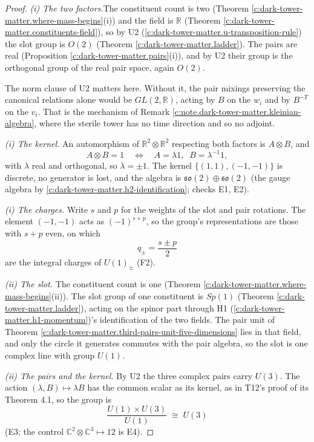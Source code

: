 \documentclass[11pt]{article}
\theoremstyle{definition}
\theoremstyle{plain}
\providecommand{\C}{}\renewcommand{\C}{\mathbb{C}}
\providecommand{\R}{}\renewcommand{\R}{\mathbb{R}}
\providecommand{\so}{}\renewcommand{\so}{\mathfrak{so}}
\begin{document}
\begin{proof}
\textit{(i) The two factors.}\enspace The constituent count is two (Theorem \ref{c:dark-tower-matter.where-mass-begins}(i)) and the field is $\R$ (Theorem \ref{c:dark-tower-matter.constituents-field}), so by U2 (\ref{c:dark-tower-matter.u-transposition-rule}) the slot group is $O(2)$ (Theorem \ref{c:dark-tower-matter.ladder}). The pairs are real (Proposition \ref{c:dark-tower-matter.pairs}(i)), and by U2 their group is the orthogonal group of the real pair space, again $O(2)$.

The norm clause of U2 matters here. Without it, the pair mixings preserving the canonical relations alone would be $GL(2,\R)$, acting by $B$ on the $w_{i}$ and by $B^{-T}$ on the $v_{i}$. That is the mechanism of Remark \ref{c:note.dark-tower-matter.kleinian-algebra}, where the sterile tower has no time direction and so no adjoint.



\emph{(i) The kernel.}  An automorphism of $\R^{2} \otimes \R^{2}$ respecting both factors is $A \otimes B$, and
\[
A \otimes B = 1 \quad\Longleftrightarrow\quad A = \lambda 1, \;\; B = \lambda^{-1}1,
\]
with $\lambda$ real and orthogonal, so $\lambda = \pm 1$. The kernel $\{(1,1), (-1,-1)\}$ is discrete, no generator is lost, and the algebra is $\so(2) \oplus \so(2)$ (the gauge algebra by \ref{c:dark-tower-matter.h2-identification}; checks E1, E2).



\emph{(i) The charges.}  Write $s$ and $p$ for the weights of the slot and pair rotations. The element $(-1, -1)$ acts as $(-1)^{s + p}$, so the group's representations are those with $s + p$ even, on which
\[
q_{\pm} = \frac{s \pm p}{2}
\]
are the integral charges of $U(1)_{\pm}$ (F2).



\emph{(ii) The slot.}  The constituent count is one (Theorem \ref{c:dark-tower-matter.where-mass-begins}(ii)). The slot group of one constituent is $Sp(1)$ (Theorem \ref{c:dark-tower-matter.ladder}), acting on the spinor part through H1 (\ref{c:dark-tower-matter.h1-momentum})'s identification of the two fields. The pair unit of Theorem \ref{c:dark-tower-matter.third-pairs-unit-five-dimensions} lies in that field, and only the circle it generates commutes with the pair algebra, so the slot is one complex line with group $U(1)$.



\emph{(ii) The pairs and the kernel.}  By U2 the three complex pairs carry $U(3)$. The action $(\lambda, B) \mapsto \lambda B$ has the common scalar as its kernel, as in T12's proof of its Theorem 4.1, so the group is
\[
\frac{U(1) \times U(3)}{U(1)} \;\cong\; U(3)
\]
(E3; the control $\C^{2} \otimes \C^{3} \mapsto 12$ is E4).

\end{proof}
\end{document}
